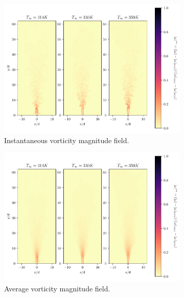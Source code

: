 \begin{figure}[htbp!]
\begin{subfigure}{0.5\textwidth}
	\centering
	\includegraphics[scale=.45]{figures/Plots/vertical/magvort_scaled_vert_all.pdf}
	\caption{Instantaneous vorticity magnitude field.} \label{all_magvort_1}
\end{subfigure}
\hfill
\begin{subfigure}{0.5\textwidth}
	\centering
	\includegraphics[scale=.45]{figures/Plots/vertical/magvort_scaled_vert_avg_all.pdf}
	\caption{Average vorticity magnitude field.} \label{all_magvort_2}
\end{subfigure}
\vfill
\centering
\begin{subfigure}{0.5\textwidth}

\end{subfigure}
\end{figure}
